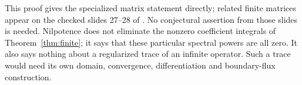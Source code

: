 This proof gives the specialized matrix statement directly; related
finite matrices appear on the checked slides 27--28 of
\cite{Sokal2023HeatZeros}. No conjectural assertion from those slides is
needed. Nilpotence does not eliminate the nonzero coefficient integrals
of Theorem~\ref{thm:finite}; it says that these particular spectral
powers are all zero. It also says nothing about a regularized trace of
an infinite operator. Such a trace would need its own domain,
convergence, differentiation and boundary-flux construction.
